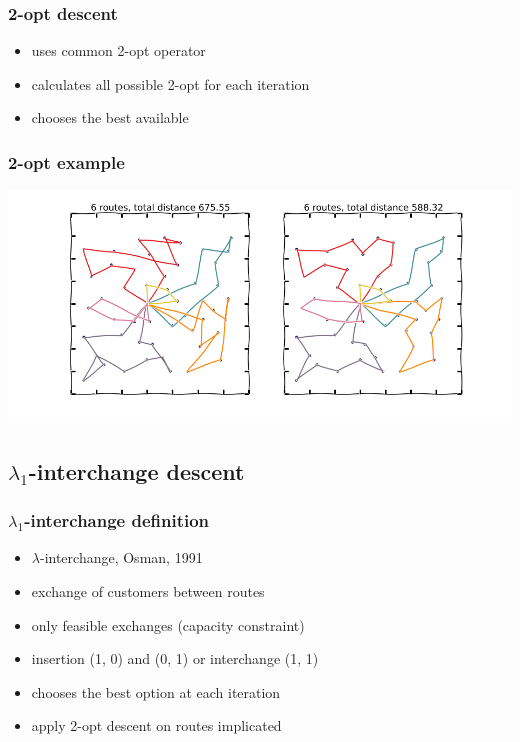 \documentclass{beamer}
\begin{document}
\begin{frame}
\frametitle{2-opt descent}
\begin{itemize}
	\item uses common 2-opt operator
	\item calculates all possible 2-opt for each iteration
	\item chooses the best available
\end{itemize}
\end{frame}

\begin{frame}
\frametitle{2-opt example}
\begin{center}
\includegraphics[scale=0.3]{figs/2opt}

\end{center}
\end{frame}


\subsection{$\lambda_1$-interchange descent}

\begin{frame}
\frametitle{$\lambda_1$-interchange definition}
\begin{itemize}
	\item $\lambda$-interchange, Osman, 1991
	\item exchange of customers between routes
	\item only feasible exchanges (capacity constraint)
	\item insertion (1, 0) and (0, 1) or interchange (1, 1)
	\item chooses the best option at each iteration
	\item apply 2-opt descent on routes implicated
\end{itemize}
\end{frame}
\end{document}

